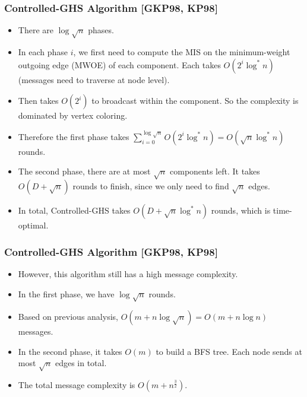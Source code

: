\begin{frame}
\frametitle{Controlled-GHS Algorithm [GKP98, KP98]}
\begin{itemize}
\item There are $\log \sqrt{n}$ phases.
\item In each phase $i$, we first need to compute the MIS on the minimum-weight outgoing edge (MWOE) of each component. Each takes $O(2^i \log^*n)$ (messages need to traverse at node level). 
\item Then takes $O(2^i)$ to broadcast within the component. So the complexity is dominated by vertex coloring.
\item Therefore the first phase takes $\sum_{i=0}^{\log \sqrt{n}} O(2^i \log^* n) = O(\sqrt{n}\log^*n)$ rounds.
\item The second phase, there are at most $\sqrt{n}$ components left. It takes $O(D + \sqrt{n})$ rounds to finish, since we only need to find $\sqrt{n}$ edges.
\item In total, Controlled-GHS takes $O(D + \sqrt{n}\log^* n)$ rounds, which is time-optimal.
\end{itemize}
\end{frame}

\begin{frame}
\frametitle{Controlled-GHS Algorithm [GKP98, KP98]}
\begin{itemize}
\item However, this algorithm still has a high message complexity.
\item In the first phase, we have $\log \sqrt n$ rounds. 
\item Based on previous analysis, $O(m + n \log \sqrt{n}) = O(m + n\log n)$ messages.
\item In the second phase, it takes $O(m)$ to build a BFS tree. Each node sends at most $\sqrt{n}$ edges in total. 
\item The total message complexity is $O(m+n^{\frac{3}{2}}).$
\end{itemize}
\end{frame}
